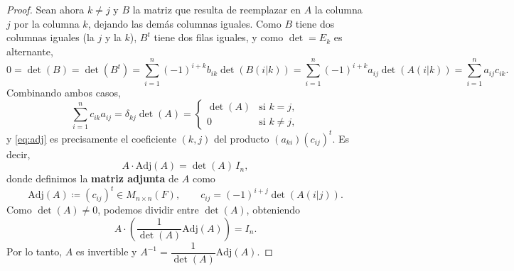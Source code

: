 \documentclass[12pt,a4paper]{book}
\newcommand{\parentesis}[1]{\left(#1\right)}
\begin{document}
\begin{proof}
        Sean ahora $k \neq j$ y $B$ la matriz que resulta de reemplazar en $A$ la columna $j$ por la columna $k$, dejando las demás columnas iguales. Como $B$ tiene dos columnas iguales (la $j$ y la $k$), $B^{t}$ tiene dos filas iguales, y como $\det = E_{k}$ es alternante,
        \begin{equation*}
            0 = \det(B) = \det(B^{t}) = \sum_{i=1}^{n} (-1)^{i+k} b_{ik} \det(B(i|k)) = \sum_{i=1}^{n} (-1)^{i+k} a_{ij} \det(A(i|k)) = \sum_{i=1}^{n} a_{ij} c_{ik}.
        \end{equation*}
        Combinando ambos casos,
        \begin{equation}
            \sum_{i=1}^{n} c_{ik} a_{ij} = \delta_{kj} \det(A) =
            \begin{cases}
                \det(A) & \text{si } k = j, \\
                0 & \text{si } k \neq j,
            \end{cases}
            \label{eq:adj}
        \end{equation}
        y \eqref{eq:adj} es precisamente el coeficiente $(k,j)$ del producto $(a_{ki})(c_{ij})^{t}$. Es decir,
        \begin{equation*}
            A \cdot \text{Adj}(A) = \det(A) \, I_{n},
        \end{equation*}
        donde definimos la \textbf{matriz adjunta} de $A$ como
        \begin{equation*}
            \text{Adj}(A) \coloneqq (c_{ij})^{t} \in M_{n \times n}(F), \qquad c_{ij} = (-1)^{i+j} \det(A(i|j)).
        \end{equation*}
        Como $\det(A) \neq 0$, podemos dividir entre $\det(A)$, obteniendo
        \begin{equation*}
            A \cdot \parentesis{\frac{1}{\det(A)} \text{Adj}(A)} = I_{n}.
        \end{equation*}
        Por lo tanto, $A$ es invertible y $A^{-1} = \dfrac{1}{\det(A)} \text{Adj}(A)$.
    \end{proof}
\end{document}
